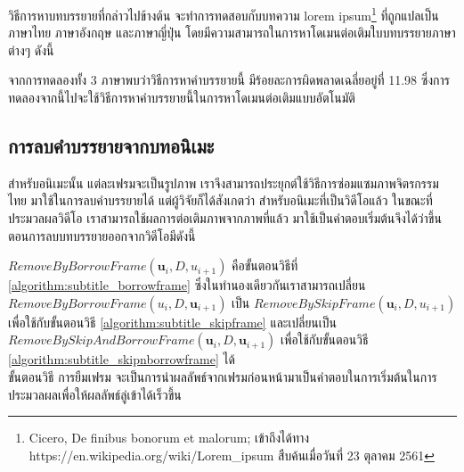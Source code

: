 \hspace{1cm} วิธีการหาบทบรรยายที่กล่าวไปข้างต้น จะทำการทดสอบกับบทความ lorem ipsum\footnote{Cicero, De finibus bonorum et malorum; เข้าถึงได้ทาง https://en.wikipedia.org/wiki/Lorem\_ipsum สืบค้นเมื่อวันที่ 23 ตุลาคม 2561} ที่ถูกแปลเป็นภาษาไทย ภาษาอังกฤษ และภาษาญี่ปุ่น โดยมีความสามารถในการหาโดเมนต่อเติมใบบทบรรยายภาษาต่างๆ ดังนี้


	

\hspace{1cm} จากการทดลองทั้ง  3 ภาษาพบว่าวิธีการหาคำบรรยายนี้ มีร้อยละการผิดพลาดเฉลี่ยอยู่ที่ 11.98 ซึ่งการทดลองจากนี้ไปจะใช้วิธีการหาคำบรรยายนี้ในการหาโดเมนต่อเติมแบบอัตโนมัติ

\subsection{การลบคำบรรยายจากบทอนิเมะ}

\hspace{1cm} สำหรับอนิเมะนั้น แต่ละเฟรมจะเป็นรูปภาพ เราจึงสามารถประยุกต์ใช้วิธีการซ่อมแซมภาพจิตรกรรมไทย มาใช้ในการลบคำบรรยายได้ แต่ผู้วิจัยก็ได้สังเกตว่า สำหรับอนิเมะที่เป็นวิดีโอแล้ว ในขณะที่ประมวลผลวิดีโอ เราสามารถใช้ผลการต่อเติมภาพจากภาพที่แล้ว มาใช้เป็นคำตอบเริ่มต้นจึงได้ว่าขึ้นตอนการลบบทบรรยายออกจากวิดีโอมีดังนี้\\
	
\vspace{0.5cm}

\vspace{0.5cm}

\hspace{1cm}  $RemoveByBorrowFrame(\boldsymbol{u}_{i},D,u_{i+1})$  คือขั้นตอนวิธีที่ \ref{algorithm:subtitle_borrowframe} ซึ่งในทำนองเดียวกันเราสามารถเปลี่ยน $RemoveByBorrowFrame(u_{i},D,\boldsymbol{u}_{i+1})$ เป็น $RemoveBySkipFrame(\boldsymbol{u}_{i},D,u_{i+1})$ เพื่อใช้กับขั้นตอนวิธี \ref{algorithm:subtitle_skipframe} และเปลี่ยนเป็น  $RemoveBySkipAndBorrowFrame(\boldsymbol{u}_{i},D,\boldsymbol{u}_{i+1})$ เพื่อใช้กับขั้นตอนวิธี \ref{algorithm:subtitle_skipnborrowframe} ได้ \\	

\vspace{0.5cm}	
\hspace{1cm} ขั้นตอนวิธี การยืมเฟรม จะเป็นการนำผลลัพธ์จากเฟรมก่อนหน้ามาเป็นคำตอบในการเริ่มต้นในการประมวลผลเพื่อให้ผลลัพธ์ลู่เข้าได้เร็วขึ้น \\
	
